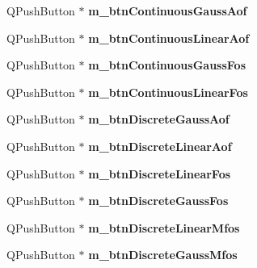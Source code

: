 \begin{DoxyCompactItemize}
Q\+Push\+Button $\ast$ {\bfseries m\+\_\+btn\+Continuous\+Gauss\+Aof}
\item 
\hypertarget{class_filter_start_buttons_box_a9902b189149804f2b2b310d296090bbb}{}\label{class_filter_start_buttons_box_a9902b189149804f2b2b310d296090bbb} 
Q\+Push\+Button $\ast$ {\bfseries m\+\_\+btn\+Continuous\+Linear\+Aof}
\item 
\hypertarget{class_filter_start_buttons_box_a259390d1b7fb12829fd71c562b52e8a8}{}\label{class_filter_start_buttons_box_a259390d1b7fb12829fd71c562b52e8a8} 
Q\+Push\+Button $\ast$ {\bfseries m\+\_\+btn\+Continuous\+Gauss\+Fos}
\item 
\hypertarget{class_filter_start_buttons_box_a409aa9a17e5bb5c29539d9fd38224a95}{}\label{class_filter_start_buttons_box_a409aa9a17e5bb5c29539d9fd38224a95} 
Q\+Push\+Button $\ast$ {\bfseries m\+\_\+btn\+Continuous\+Linear\+Fos}
\item 
\hypertarget{class_filter_start_buttons_box_a1f49b917149118e1154b80794b4d9745}{}\label{class_filter_start_buttons_box_a1f49b917149118e1154b80794b4d9745} 
Q\+Push\+Button $\ast$ {\bfseries m\+\_\+btn\+Discrete\+Gauss\+Aof}
\item 
\hypertarget{class_filter_start_buttons_box_ad4078ff36345b48faf6f7dd7d2a60242}{}\label{class_filter_start_buttons_box_ad4078ff36345b48faf6f7dd7d2a60242} 
Q\+Push\+Button $\ast$ {\bfseries m\+\_\+btn\+Discrete\+Linear\+Aof}
\item 
\hypertarget{class_filter_start_buttons_box_abba449699e4463641283205e361bcddc}{}\label{class_filter_start_buttons_box_abba449699e4463641283205e361bcddc} 
Q\+Push\+Button $\ast$ {\bfseries m\+\_\+btn\+Discrete\+Linear\+Fos}
\item 
\hypertarget{class_filter_start_buttons_box_a10ac8ab5ce3c82935998a0bcc1285151}{}\label{class_filter_start_buttons_box_a10ac8ab5ce3c82935998a0bcc1285151} 
Q\+Push\+Button $\ast$ {\bfseries m\+\_\+btn\+Discrete\+Gauss\+Fos}
\item 
\hypertarget{class_filter_start_buttons_box_a5cb821364e9968079572d8ebd78ce675}{}\label{class_filter_start_buttons_box_a5cb821364e9968079572d8ebd78ce675} 
Q\+Push\+Button $\ast$ {\bfseries m\+\_\+btn\+Discrete\+Linear\+Mfos}
\item 
\hypertarget{class_filter_start_buttons_box_a6e477a2caf94198d131a0c6297cf4d78}{}\label{class_filter_start_buttons_box_a6e477a2caf94198d131a0c6297cf4d78} 
Q\+Push\+Button $\ast$ {\bfseries m\+\_\+btn\+Discrete\+Gauss\+Mfos}
\end{DoxyCompactItemize}


